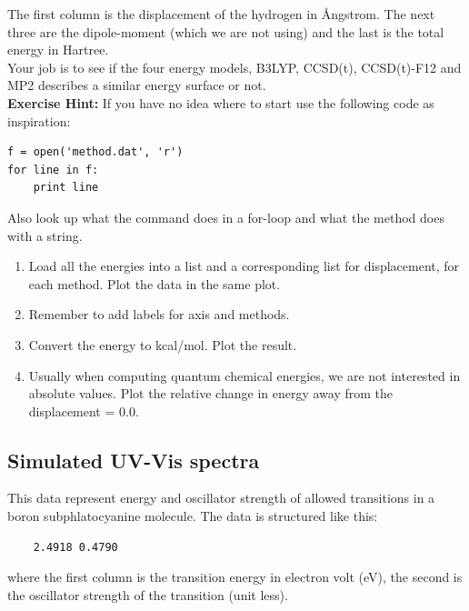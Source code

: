 \documentclass{article}
\begin{document}
The first column is the displacement of the hydrogen in \AA ngstrom. The next three are the dipole-moment (which we are not using) and the last is the total energy in Hartree.\\

Your job is to see if the four energy models, B3LYP, CCSD(t), CCSD(t)-F12 and MP2 describes a similar energy surface or not.\\

{\bf Exercise Hint:}
If you have no idea where to start use the following code as inspiration:

\begin{lstlisting}
f = open('method.dat', 'r')
for line in f:
    print line

\end{lstlisting}

Also look up what the command  does in a for-loop and what the method  does with a string. %

\begin{enumerate}
    \item Load all the energies into a list and a corresponding list for displacement,
          for each method.
          Plot the data in the same plot.

    \item Remember to add labels for axis and methods.

    \item Convert the energy to kcal/mol.
          Plot the result.

    \item Usually when computing quantum chemical energies, we are not interested in absolute values.
          Plot the relative change in energy away from the displacement = 0.0.

\end{enumerate}

\newpage
\subsection{Simulated UV-Vis spectra}
This data represent energy and oscillator strength of allowed transitions in a boron subphlatocyanine molecule. The data is structured like this:
\begin{lstlisting}
    2.4918 0.4790
\end{lstlisting}
where the first column is the transition energy in electron volt (eV), the second is the oscillator strength of the transition (unit less).\\
\end{document}
